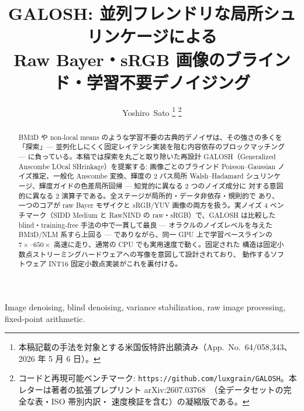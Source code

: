 \documentclass[journal]{IEEEtran}
\begin{document}
\title{GALOSH: 並列フレンドリな局所シュリンケージによる\\
Raw Bayer・sRGB 画像のブラインド・学習不要デノイジング}

\author{Yoshiro~Sato%
\thanks{本稿記載の手法を対象とする米国仮特許出願済み（App.\ No.\ 64/058,343、
2026 年 5 月 6 日）。}%
\thanks{コードと再現可能ベンチマーク:
\texttt{https://github.com/luxgrain/GALOSH}。本レターは著者の拡張プレプリント
arXiv:2607.03768~\cite{galosharxiv}（全データセットの完全な表・ISO 帯別内訳・
速度検証を含む）の凝縮版である。}}

\maketitle

\begin{abstract}
BM3D や non-local means のような学習不要の古典的デノイザは、その強さの多くを
「探索」--- 並列化しにくく固定レイテンシ実装を阻む内容依存のブロックマッチング
--- に負っている。本稿では探索を丸ごと取り除いた再設計 GALOSH（Generalized
Anscombe LOcal SHrinkage）を提案する: 画像ごとのブラインド Poisson--Gaussian
ノイズ推定、一般化 Anscombe 変換、輝度の 2 パス局所 Walsh--Hadamard
シュリンケージ、輝度ガイドの色差局所回帰 --- 知覚的に異なる 2 つのノイズ成分に
対する意図的に異なる 2 演算子である。全ステージが局所的・データ非依存・規則的で
あり、一つのコアが raw Bayer モザイクと sRGB/YUV 画像の両方を扱う。実ノイズ 4
ベンチマーク（SIDD Medium と RawNIND の raw・sRGB）で、GALOSH は比較した
blind・training-free 手法の中で一貫して最良 --- オラクルのノイズレベルを与えた
BM3D/NLM 系すら上回る --- でありながら、同一 GPU 上で学習ベースラインの
$7\times$--$650\times$ 高速に走り、通常の CPU でも実用速度で動く。固定された
構造は固定小数点ストリーミングハードウェアへの写像を意図して設計されており、
動作するソフトウェア INT16 固定小数点実装がこれを裏付ける。
\end{abstract}

\begin{IEEEkeywords}
Image denoising, blind denoising, variance stabilization, raw image
processing, fixed-point arithmetic.
\end{IEEEkeywords}
\end{document}
